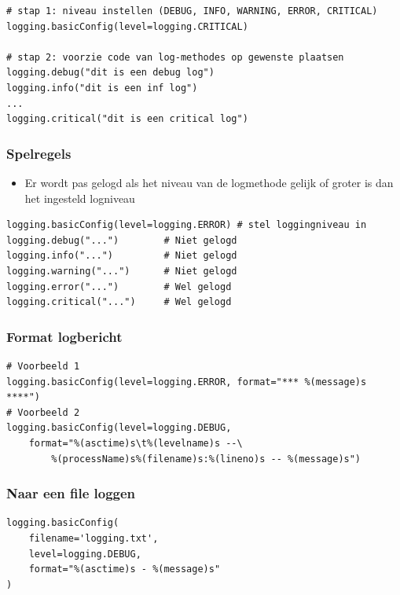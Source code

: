 \documentclass{article}
\begin{document}
\begin{verbatim}
# stap 1: niveau instellen (DEBUG, INFO, WARNING, ERROR, CRITICAL)
logging.basicConfig(level=logging.CRITICAL)

# stap 2: voorzie code van log-methodes op gewenste plaatsen
logging.debug("dit is een debug log")
logging.info("dit is een inf log")
...
logging.critical("dit is een critical log")
\end{verbatim}

\subsubsection{Spelregels}

\begin{itemize}
    \item Er wordt pas gelogd als het niveau van de logmethode gelijk of groter is dan het ingesteld logniveau
\end{itemize}

\begin{verbatim}
logging.basicConfig(level=logging.ERROR) # stel loggingniveau in
logging.debug("...")        # Niet gelogd
logging.info("...")         # Niet gelogd
logging.warning("...")      # Niet gelogd
logging.error("...")        # Wel gelogd
logging.critical("...")     # Wel gelogd
\end{verbatim}

\subsubsection{Format logbericht}

\begin{verbatim}
# Voorbeeld 1
logging.basicConfig(level=logging.ERROR, format="*** %(message)s ****")
# Voorbeeld 2
logging.basicConfig(level=logging.DEBUG,
    format="%(asctime)s\t%(levelname)s --\
        %(processName)s%(filename)s:%(lineno)s -- %(message)s")
\end{verbatim}

\subsubsection{Naar een file loggen}

\begin{verbatim}
logging.basicConfig(
    filename='logging.txt',
    level=logging.DEBUG,
    format="%(asctime)s - %(message)s"
)
\end{verbatim}
\end{document}
